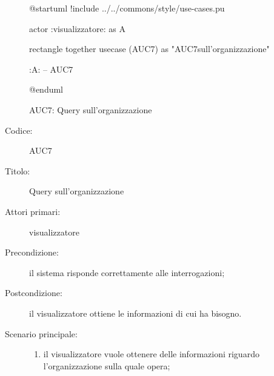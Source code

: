 \documentclass[../../../analisi-dei-requisiti.tex]{subfiles}
\begin{document}
\begin{figure}[H]
  \centering
  \begin{plantuml}
  @startuml
  !include ../../commons/style/use-cases.pu

  actor :visualizzatore: as A

  rectangle {
    together {
      usecase (AUC7) as "AUC7\nQuery sull'organizzazione"
    }
  }

  :A: -- AUC7

  @enduml
  \end{plantuml}
  \caption{AUC7: Query sull'organizzazione}
  \label{fig:AUC7}
\end{figure}

\begin{description}
  \item[Codice:] AUC7
  \item[Titolo:] Query sull'organizzazione
  \item[Attori primari:] visualizzatore
  \item[Precondizione:] il sistema risponde correttamente alle interrogazioni;
  \item[Postcondizione:] il visualizzatore ottiene le informazioni di cui ha bisogno.
  \item[Scenario principale:]
  \begin{enumerate}
    \item il visualizzatore vuole ottenere delle informazioni riguardo l'organizzazione sulla quale opera;
  \end{enumerate}
\end{description}
\end{document}
